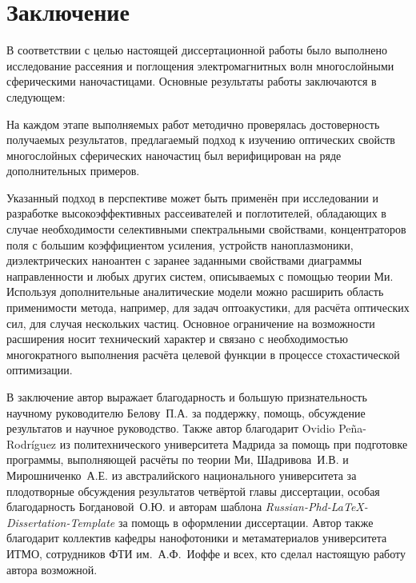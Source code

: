\chapter*{Заключение}						%

В соответствии с целью настоящей диссертационной работы было выполнено
исследование рассеяния и поглощения электромагнитных волн
многослойными сферическими наночастицами.
Основные результаты работы заключаются в следующем:

На каждом этапе выполняемых работ методично проверялась достоверность
получаемых результатов, предлагаемый подход к изучению оптических
свойств многослойных сферических наночастиц был верифицирован на ряде
дополнительных примеров.

Указанный подход в перспективе может быть применён при исследовании и
разработке высокоэффективных рассеивателей и поглотителей, обладающих
в случае необходимости селективными спектральными свойствами,
концентраторов поля с большим коэффициентом усиления, устройств
наноплазмоники, диэлектрических наноантен с заранее заданными
свойствами диаграммы направленности и любых других систем, описываемых
с помощью теории Ми. Используя дополнительные аналитические модели
можно расширить область применимости метода, например, для задач
оптоакустики, для расчёта оптических сил, для случая нескольких
частиц. Основное ограничение на возможности расширения носит
технический характер и связано с необходимостью многократного
выполнения расчёта целевой функции в процессе стохастической
оптимизации.

В заключение автор выражает благодарность и большую признательность
научному руководителю Белову~П.А. за поддержку, помощь, обсуждение
результатов и научное руководство. Также автор благодарит Ovidio
Pe\~{n}a-Rodr\'{i}guez из политехнического университета Мадрида за
помощь при подготовке программы, выполняющей расчёты по теории Ми,
Шадривова~И.В. и Мирошниченко~А.Е. из австралийского национального
университета за плодотворные обсуждения результатов четвёртой главы
диссертации, особая благодарность Богдановой~О.Ю. и авторам шаблона 
\textit{Russian-Phd-LaTeX-Dissertation-Template} за помощь в
оформлении диссертации. Автор также благодарит коллектив кафедры
нанофотоники и метаматериалов университета ИТМО, сотрудников ФТИ
им.~А.Ф.~Иоффе и всех, кто сделал настоящую работу автора возможной.
